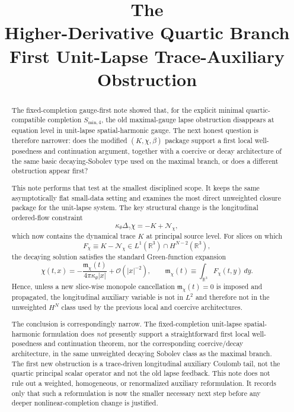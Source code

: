 \documentclass[11pt]{article}
\title{\textbf{The \TheoryName{}}\\[0.4em]
\large Higher-Derivative Quartic Branch First Unit-Lapse Trace-Auxiliary Obstruction}
\author{}
\date{}
\begin{document}
\maketitle

\begin{abstract}
The fixed-completion gauge-first note showed that, for the explicit minimal quartic-compatible completion \(S_{\mathrm{min},4}\), the old maximal-gauge lapse obstruction disappears at equation level in unit-lapse spatial-harmonic gauge. The next honest question is therefore narrower: does the modified \((K,\chi,\beta)\) package support a first local well-posedness and continuation argument, together with a coercive or decay architecture of the same basic decaying-Sobolev type used on the maximal branch, or does a different obstruction appear first?

This note performs that test at the smallest disciplined scope. It keeps the same asymptotically flat small-data setting and examines the most direct unweighted closure package for the unit-lapse system. The key structural change is the longitudinal ordered-flow constraint
\[
\kappa_\theta \Delta_\gamma \chi
=
-K+\mathcal N_\chi,
\]
which now contains the dynamical trace \(K\) at principal source level. For slices on which
\[
F_\chi \equiv K-\mathcal N_\chi \in L^1(\mathbb R^3)\cap H^{N-2}(\mathbb R^3),
\]
the decaying solution satisfies the standard Green-function expansion
\[
\chi(t,x)
=
-\frac{\mathfrak m_\chi(t)}{4\pi\kappa_\theta |x|}
+ \mathcal O(|x|^{-2}),
\qquad
\mathfrak m_\chi(t)\equiv \int_{\mathbb R^3}F_\chi(t,y)\,dy.
\]
Hence, unless a new slice-wise monopole cancellation \(\mathfrak m_\chi(t)=0\) is imposed and propagated, the longitudinal auxiliary variable is not in \(L^2\) and therefore not in the unweighted \(H^N\) class used by the previous local and coercive architectures.

The conclusion is correspondingly narrow. The fixed-completion unit-lapse spatial-harmonic formulation does \emph{not} presently support a straightforward first local well-posedness and continuation theorem, nor the corresponding coercive/decay architecture, in the same unweighted decaying Sobolev class as the maximal branch. The first new obstruction is a trace-driven longitudinal auxiliary Coulomb tail, not the quartic principal scalar operator and not the old lapse feedback. This note does not rule out a weighted, homogeneous, or renormalized auxiliary reformulation. It records only that such a reformulation is now the smaller necessary next step before any deeper nonlinear-completion change is justified.
\end{abstract}
\end{document}
